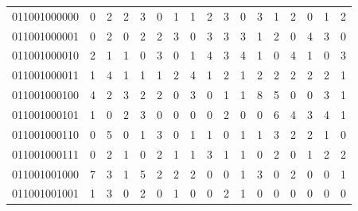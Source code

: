 \documentclass[10pt,a4paper]{article}
\begin{document}
\begin{longtable}{ |c|c|c|c|c|c|c|c|c|c|c|c|c|c|c|c|c| }
    011001000000              & 0                            & 2                                & 2                            & 3                              & 0   & 1   & 1   & 2   & 3   & 0   & 3   & 1   & 2   & 0   & 1   & 2   \\
    011001000001              & 0                            & 2                                & 0                            & 2                              & 2   & 3   & 0   & 3   & 3   & 3   & 1   & 2   & 0   & 4   & 3   & 0   \\
    011001000010              & 2                            & 1                                & 1                            & 0                              & 3   & 0   & 1   & 4   & 3   & 4   & 1   & 0   & 4   & 1   & 0   & 3   \\
    011001000011              & 1                            & 4                                & 1                            & 1                              & 1   & 2   & 4   & 1   & 2   & 1   & 2   & 2   & 2   & 2   & 2   & 1   \\
    011001000100              & 4                            & 2                                & 3                            & 2                              & 2   & 0   & 3   & 0   & 1   & 1   & 8   & 5   & 0   & 0   & 3   & 1   \\
    011001000101              & 1                            & 0                                & 2                            & 3                              & 0   & 0   & 0   & 0   & 2   & 0   & 0   & 6   & 4   & 3   & 4   & 1   \\
    011001000110              & 0                            & 5                                & 0                            & 1                              & 3   & 0   & 1   & 1   & 0   & 1   & 1   & 3   & 2   & 2   & 1   & 0   \\
    011001000111              & 0                            & 2                                & 1                            & 0                              & 2   & 1   & 1   & 3   & 1   & 1   & 0   & 2   & 0   & 1   & 2   & 2   \\
    011001001000              & 7                            & 3                                & 1                            & 5                              & 2   & 2   & 2   & 0   & 0   & 1   & 3   & 0   & 2   & 0   & 0   & 1   \\
    011001001001              & 1                            & 3                                & 0                            & 2                              & 0   & 1   & 0   & 0   & 2   & 1   & 0   & 0   & 0   & 0   & 0   & 0   \\

\end{longtable}
\end{document}
